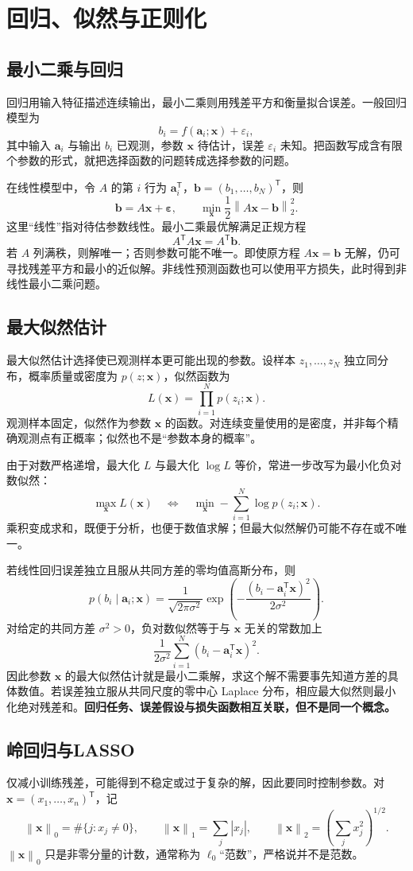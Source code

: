 \documentclass[UTF8,fontset=fandol,a4paper,12pt]{ctexart}
\newcommand{\vx}{\boldsymbol x}
\newcommand{\va}{\boldsymbol a}
\newcommand{\vb}{\boldsymbol b}
\newcommand{\norm}[1]{\left\lVert#1\right\rVert}
\theoremstyle{definition}
\begin{document}
\section{回归、似然与正则化}
\subsection{最小二乘与回归}
回归用输入特征描述连续输出，最小二乘则用残差平方和衡量拟合误差。一般回归模型为
\[
 b_i=f(\va_i;\vx)+\varepsilon_i,
\]
其中输入 $\va_i$ 与输出 $b_i$ 已观测，参数 $\vx$ 待估计，误差 $\varepsilon_i$ 未知。把函数写成含有限个参数的形式，就把选择函数的问题转成选择参数的问题。

在线性模型中，令 $A$ 的第 $i$ 行为 $\va_i^{\mathsf T}$，$\vb=(b_1,\ldots,b_N)^{\mathsf T}$，则
\[
 \vb=A\vx+\boldsymbol\varepsilon,\qquad
 \boxed{\min_{\vx}\frac12\norm{A\vx-\vb}_2^2.}
\]
这里“线性”指对待估参数线性。最小二乘最优解满足正规方程
\[
 A^{\mathsf T}A\vx=A^{\mathsf T}\vb.
\]
若 $A$ 列满秩，则解唯一；否则参数可能不唯一。即使原方程 $A\vx=\vb$ 无解，仍可寻找残差平方和最小的近似解。非线性预测函数也可以使用平方损失，此时得到非线性最小二乘问题。

\subsection{最大似然估计}
最大似然估计选择使已观测样本更可能出现的参数。设样本 $z_1,\ldots,z_N$ 独立同分布，概率质量或密度为 $p(z;\vx)$，似然函数为
\[
 L(\vx)=\prod_{i=1}^N p(z_i;\vx).
\]
观测样本固定，似然作为参数 $\vx$ 的函数。对连续变量使用的是密度，并非每个精确观测点有正概率；似然也不是“参数本身的概率”。

由于对数严格递增，最大化 $L$ 与最大化 $\log L$ 等价，常进一步改写为最小化负对数似然：
\[
 \max_{\vx}L(\vx)
 \quad\Longleftrightarrow\quad
 \min_{\vx}-\sum_{i=1}^N\log p(z_i;\vx).
\]
乘积变成求和，既便于分析，也便于数值求解；但最大似然解仍可能不存在或不唯一。

若线性回归误差独立且服从共同方差的零均值高斯分布，则
\[
 p(b_i\mid\va_i;\vx)
 =\frac1{\sqrt{2\pi\sigma^2}}
 \exp\!\left(-\frac{(b_i-\va_i^{\mathsf T}\vx)^2}{2\sigma^2}\right).
\]
对给定的共同方差 $\sigma^2>0$，负对数似然等于与 $\vx$ 无关的常数加上
\[
 \frac1{2\sigma^2}\sum_{i=1}^N(b_i-\va_i^{\mathsf T}\vx)^2.
\]
因此参数 $\vx$ 的最大似然估计就是最小二乘解，求这个解不需要事先知道方差的具体数值。若误差独立服从共同尺度的零中心 Laplace 分布，相应最大似然则最小化绝对残差和。\textbf{回归任务、误差假设与损失函数相互关联，但不是同一个概念。}

\subsection{岭回归与LASSO}
仅减小训练残差，可能得到不稳定或过于复杂的解，因此要同时控制参数。对 $\vx=(x_1,\ldots,x_n)^{\mathsf T}$，记
\[
 \norm{\vx}_0=\#\{j:x_j\ne0\},\qquad
 \norm{\vx}_1=\sum_j|x_j|,\qquad
 \norm{\vx}_2=\left(\sum_jx_j^2\right)^{1/2}.
\]
$\norm{\vx}_0$ 只是非零分量的计数，通常称为 $\ell_0$“范数”，严格说并不是范数。
\end{document}
